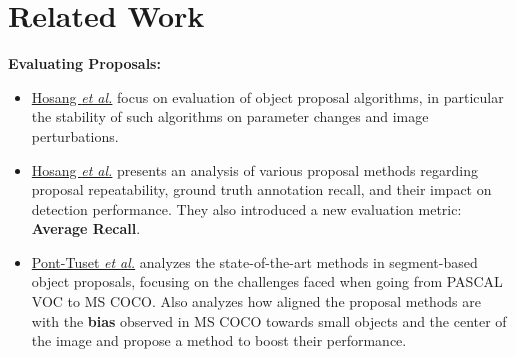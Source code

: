 \documentclass[10pt]{article}
\begin{document}
\section{Related Work}%
\label{sec:related}
\textbf{Evaluating Proposals:}
%
\begin{itemize}
  \item \href{https://arxiv.org/pdf/1406.6962.pdf}{Hosang \textit{et al.}}
    focus on evaluation of object proposal algorithms, in particular the
    stability of such algorithms on parameter changes and image perturbations.
  \item \href{https://arxiv.org/pdf/1502.05082.pdf}{Hosang \textit{et al.}}
    presents an analysis of various proposal methods regarding proposal
    repeatability, ground truth annotation recall, and their impact on
    detection performance. They also introduced a new evaluation metric:
    \textbf{Average Recall}.
  \item \href{http://www.vision.ee.ethz.ch/~biwiproposals/boosting-coco/}{Pont-Tuset \textit{et al.}}
    analyzes the state-of-the-art methods in segment-based object proposals,
    focusing on the challenges faced when going from PASCAL VOC to MS COCO\@.
    Also analyzes how aligned the proposal methods are with the \textbf{bias}
    observed in MS COCO towards small objects and the center of the image and
    propose a method to boost their performance.
\end{itemize}

\end{document}
